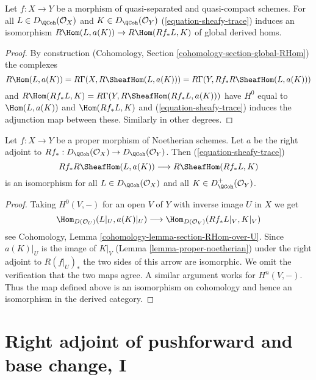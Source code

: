 \begin{lemma}
\label{lemma-iso-global-hom}
Let $f : X \to Y$ be a morphism of quasi-separated and quasi-compact
schemes.
For all $L \in D_\QCoh(\mathcal{O}_X)$ and $K \in D_\QCoh(\mathcal{O}_Y)$
(\ref{equation-sheafy-trace}) induces an isomorphism
$R\Hom(L, a(K)) \to R\Hom(Rf_*L, K)$ of global derived homs.
\end{lemma}

\begin{proof}
By construction (Cohomology, Section \ref{cohomology-section-global-RHom})
the complexes
$$
R\Hom(L, a(K)) = R\Gamma(X, R\SheafHom(L, a(K))) =
R\Gamma(Y, Rf_*R\SheafHom(L, a(K)))
$$
and $R\Hom(Rf_*L, K) = R\Gamma(Y, R\SheafHom(Rf_*L, a(K)))$
have $H^0$ equal to $\Hom(L, a(K))$ and $\Hom(Rf_*L, K)$ and
(\ref{equation-sheafy-trace}) induces the adjunction map
between these. Similarly in other degrees.
\end{proof}

\begin{lemma}
\label{lemma-proper-noetherian-relative}
Let $f : X \to Y$ be a proper morphism of Noetherian schemes.
Let $a$ be the right adjoint to
$Rf_* : D_\QCoh(\mathcal{O}_X) \to D_\QCoh(\mathcal{O}_Y)$.
Then (\ref{equation-sheafy-trace})
$$
Rf_*R\SheafHom(L, a(K)) \longrightarrow R\SheafHom(Rf_*L, K)
$$
is an isomorphism for all $L \in D_\QCoh(\mathcal{O}_X)$ and all
$K \in D^+_\QCoh(\mathcal{O}_Y)$.
\end{lemma}

\begin{proof}
Taking $H^0(V, -)$ for an open $V$ of $Y$ with inverse image $U$ in $X$ we get
$$
\Hom_{D(\mathcal{O}_U)}(L|_U, a(K)|_U) \longrightarrow
\Hom_{D(\mathcal{O}_V)}(Rf_*L|_V, K|_V)
$$
see Cohomology, Lemma \ref{cohomology-lemma-section-RHom-over-U}.
Since $a(K)|_U$ is the image of $K|_V$ (Lemma \ref{lemma-proper-noetherian})
under the right adjoint to $R(f|_U)_*$ the two
sides of this arrow are isomorphic. We omit the verification that
the two maps agree. A similar argument works for $H^n(V, -)$.
Thus the map defined above is an isomorphism on cohomology
and hence an isomorphism in the derived category.
\end{proof}






\section{Right adjoint of pushforward and base change, I}
\label{section-base-change-map}

